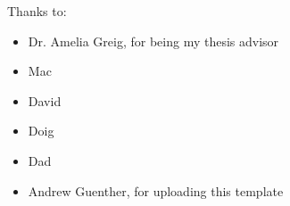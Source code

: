 \noindent
Thanks to:
\begin{itemize}
    \item Dr. Amelia Greig, for being my thesis advisor
    \item Mac
    \item David
    \item Doig
    \item Dad
    \item Andrew Guenther, for uploading this template
\end{itemize}

